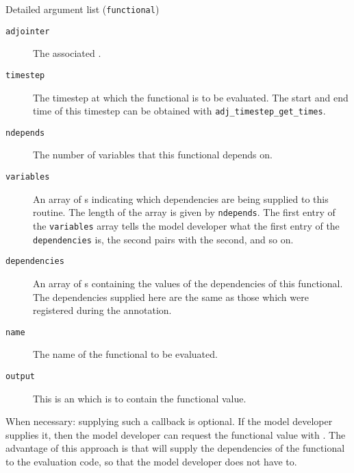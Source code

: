 \begin{boxwithtitle}{Detailed argument list (\texttt{functional})}
\begin{description}
\item[\texttt{adjointer}] The associated .
\item[\texttt{timestep}] The timestep at which the functional is to be evaluated. The start and end time of this timestep can be obtained with \texttt{adj_timestep_get_times}.
\item[\texttt{ndepends}] The number of variables that this functional depends on.
\item[\texttt{variables}] An array of s indicating which dependencies are being supplied to this routine. The length of the
array is given by \texttt{ndepends}. The first entry of the \texttt{variables} array
tells the model developer what the first entry of the \texttt{dependencies} is, the second pairs with the second, and so on.
\item[\texttt{dependencies}] An array of s containing the values of the dependencies of this functional. The dependencies supplied
here are the same as those which were registered during the annotation.
\item[\texttt{name}] The name of the functional to be evaluated.
\item[\texttt{output}] This is an  which is to contain the functional value. 
\end{description}
\end{boxwithtitle}

When necessary: supplying such a callback is optional. If the model developer supplies it, then the
model developer can request the functional value with . The advantage
of this approach is that \libadjoint will supply the dependencies of the functional to the evaluation
code, so that the model developer does not have to.
